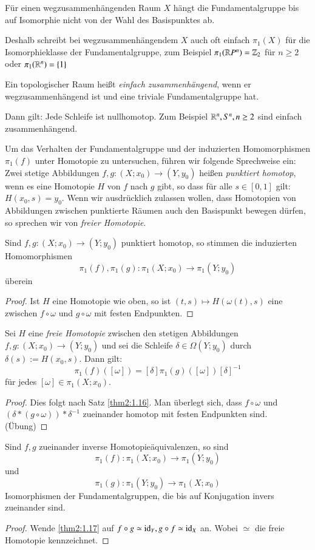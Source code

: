 \documentclass[a4paper,10pt]{scrartcl}
\begin{document}
\begin{kor}
 Für einen wegzusammenhängenden Raum $X$ hängt die Fundamentalgruppe bis auf Isomorphie nicht von der Wahl des Basispunktes ab.

Deshalb schreibt bei wegzusammenhängendem $X$ auch oft einfach $\pi_1(X)$ für die Isomorphieklasse der Fundamentalgruppe, zum Beispiel $\pi_1(\mathbb{R} P^n)=\mathbb{Z}_2$ für $n\ge 2$ oder $\pi_1(\mathbb{R}^n)=\{1\}$
\end{kor}
\begin{df}
 Ein topologischer Raum heißt \emph{einfach zusammenhängend}, wenn er wegzusammenhängend ist und eine triviale Fundamentalgruppe hat.

Dann gilt: Jede Schleife ist nullhomotop. Zum Beispiel $\mathbb{R}^n, S^n, n\ge 2$ sind einfach zusammenhängend.  
\end{df}

Um das Verhalten der Fundamentalgruppe und der induzierten Homomorphismen $\pi_1(f)$ unter Homotopie zu untersuchen, führen wir folgende Sprechweise ein: Zwei stetige Abbildungen $f,g: (X;x_0)\to (Y,y_0)$ heißen \emph{punktiert homotop}, wenn es eine Homotopie $H$ von $f$ nach $g$ gibt, so dass für alle $s\in [0,1]$ gilt: $H(x_0, s)=y_0$. Wenn wir ausdrücklich zulassen wollen, dass Homotopien von Abbildungen zwischen punktierte Räumen auch den Basispunkt bewegen dürfen, so sprechen wir von \emph{freier Homotopie}.

\begin{st} \label{thm2:1.16}
 Sind $f,g: (X;x_0)\to (Y;y_0)$ punktiert homotop, so stimmen die induzierten Homomorphismen
\[
 \pi_1(f), \pi_1(g): \pi_1(X;x_0)\to \pi_1(Y;y_0)
\]
überein
\end{st}
\begin{proof}
 Ist $H$ eine Homotopie wie oben, so ist $(t,s)\mapsto H(\omega(t), s)$ eine zwischen $f\circ \omega$ und $g\circ \omega$ mit festen Endpunkten.
\end{proof}

\begin{st}\label{thm2:1.17}
 Sei $H$ eine \emph{freie Homotopie} zwischen den stetigen Abbildungen $f,g: (X;x_0)\to (Y;y_0)$ und sei die Schleife $\delta\in \Omega(Y;y_0)$ durch $\delta(s):=H(x_0, s)$. Dann gilt:
\[
 \pi_1(f)([\omega])=[\delta]\pi_1(g)([\omega]){[\delta]}^{-1}
\]
für jedes $[\omega]\in \pi_1(X;x_0)$.
\end{st}

\begin{proof}
 Dies folgt nach Satz \ref{thm2:1.16}. Man überlegt sich, dass $f\circ \omega$ und $(\delta*(g \circ \omega))*\delta^{-1}$ zueinander homotop mit festen Endpunkten sind. (Übung)
\end{proof}
\begin{kor}
 Sind $f,g$ zueinander inverse Homotopieäquivalenzen, so sind
\[
\pi_1(f):\pi_1(X;x_0)\to \pi_1(Y;y_0)
\]
und
\[
 \pi_1(g):\pi_1(Y;y_0)\to \pi_1(X;x_0)
\]
Isomorphismen der Fundamentalgruppen, die bis auf Konjugation invers zueinander sind. 
\end{kor}
\begin{proof}
 Wende \ref{thm2:1.17} auf $f\circ g \simeq \operatorname{id}_Y, g\circ f \simeq \operatorname{id}_X$ an.  Wobei $\simeq$ die freie Homotopie kennzeichnet.
\end{proof}
\end{document}
